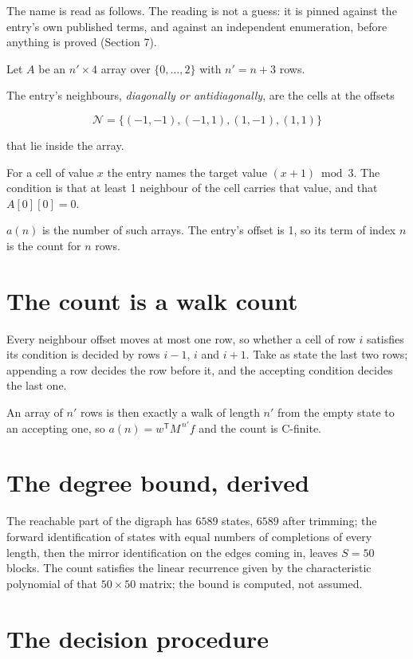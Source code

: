 \documentclass[11pt]{article}
\theoremstyle{definition}
\begin{document}
The name is read as follows. The reading is not a guess: it is pinned against the entry's own published terms, and against an independent enumeration, before anything is proved (Section 7).

Let $A$ be an $n' \times 4$ array over $\{0,\dots,2\}$ with $n' = n + 3$ rows.

The entry's neighbours, {\itshape diagonally or antidiagonally}, are the cells at the offsets

\[\mathcal{N} = \{(-1,-1), (-1,1), (1,-1), (1,1)\}\]

that lie inside the array.

For a cell of value $x$ the entry names the target value $(x + 1) \bmod 3$. The condition is that at least 1 neighbour of the cell carries that value, and that $A[0][0] = 0$.

$a(n)$ is the number of such arrays. The entry's offset is 1, so its term of index $n$ is the count for $n$ rows.

\section{The count is a walk count}

Every neighbour offset moves at most one row, so whether a cell of row $i$ satisfies its condition is decided by rows $i-1$, $i$ and $i+1$. Take as state the last two rows; appending a row decides the row before it, and the accepting condition decides the last one.

An array of $n'$ rows is then exactly a walk of length $n'$ from the empty state to an accepting one, so $a(n) = w^{\mathsf T}M^{\,n'}f$ and the count is C-finite.

\section{The degree bound, derived}

The reachable part of the digraph has $6589$ states, $6589$ after trimming; the forward identification of states with equal numbers of completions of every length, then the mirror identification on the edges coming in, leaves $S = 50$ blocks. The count satisfies the linear recurrence given by the characteristic polynomial of that $50\times50$ matrix; the bound is computed, not assumed.

\section{The decision procedure}
\end{document}
